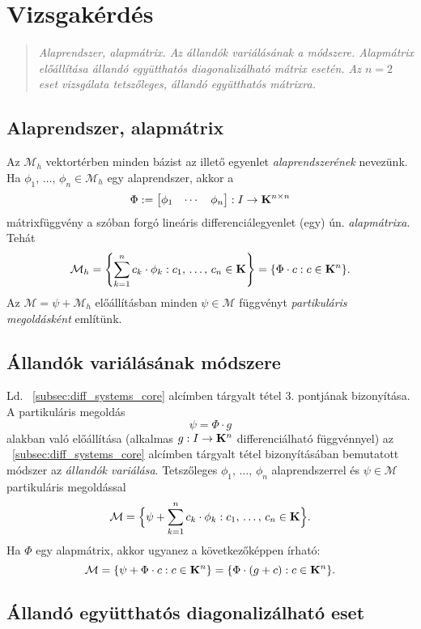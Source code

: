 \newpage
\section{Vizsgakérdés}
\begin{quote}
	\textit{Alaprendszer, alapmátrix. Az állandók variálásának a módszere. Alapmátrix előállítása állandó együtthatós diagonalizálható mátrix esetén. Az $n=2$ eset vizsgálata tetszőleges, állandó együtthatós mátrixra.}
\end{quote}

\subsection{Alaprendszer, alapmátrix}

Az $\mathcal{M}_h$ vektortérben minden bázist az illető egyenlet \textit{alaprendszerének} nevezünk. Ha $\phi_1, \, \dots, \, \phi_n \in \mathcal{M}_h$ egy alaprendszer, akkor a
\[
	\Phi := \begin{bmatrix}
		\phi_1 & \cdots & \phi_n
	\end{bmatrix} : I \to \mathbf{K}^{n \times n}
\]
mátrixfüggvény a szóban forgó lineáris differenciálegyenlet (egy) ún. \textit{alapmátrixa}. Tehát
\[
	\mathcal{M}_h = \left\{ \sum_{k=1}^n c_k \cdot \phi_k : c_1, \, \dots, \, c_n \in \mathbf{K} \right\} = \{ \Phi \cdot c : c \in \mathbf{K}^n \}.
\]
Az $\mathcal{M} = \psi + \mathcal{M}_h$ előállításban minden $\psi \in \mathcal{M}$ függvényt \textit{partikuláris megoldásként} említünk.

\subsection{Állandók variálásának módszere}
Ld. ~\ref{subsec:diff_systems_core} alcímben tárgyalt tétel 3. pontjának bizonyítása. A partikuláris megoldás
\[
	\psi = \Phi \cdot g
\]
alakban való előállítása (alkalmas $g : I \to \mathbf{K}^n$ differenciálható függvénnyel) az ~\ref{subsec:diff_systems_core} alcímben tárgyalt tétel bizonyításában bemutatott módszer az \textit{állandók variálása}. Tetszőleges $\phi_1, \, \dots, \, \phi_n$ alaprendszerrel és $\psi \in \mathcal{M}$ partikuláris megoldással
\[
	\mathcal{M} = \Big\{ \psi + \sum_{k=1}^n c_k \cdot \phi_k : c_1, \, \dots, \, c_n \in \mathbf{K}  \Big\}.
\]
Ha $\Phi$ egy alapmátrix, akkor ugyanez a következőképpen írható:
\[
	\mathcal{M} = \{ \psi + \Phi \cdot c : c \in \mathbf{K}^n \} = \{ \Phi \cdot (g + c) : c \in \mathbf{K}^n \}.
\]

\subsection{Állandó együtthatós diagonalizálható eset}

